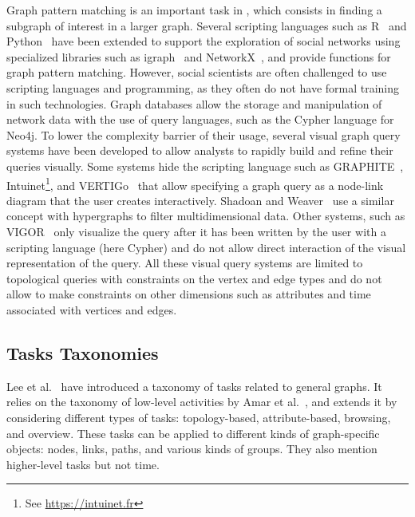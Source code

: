 Graph pattern matching is an important task in \sna, which consists in finding a subgraph of interest in a larger graph\cite{fanGraphPatternMatching2012}.
Several scripting languages such as R~\cite{Rstat} and Python~\cite{Python} have been extended to support the exploration of social networks using specialized libraries such as igraph~\cite{igraph} and NetworkX~\cite{networkx}, and provide functions for graph pattern matching.
However, social scientists are often challenged to use scripting languages and programming, as they often do not have formal training in such technologies.
Graph databases allow the storage and manipulation of network data with the use of query languages, such as the Cypher language for Neo4j\cite{neo4j}.
To lower the complexity barrier of their usage, several visual graph query systems have been developed to allow analysts to rapidly build and refine their queries visually.
Some systems hide the scripting language such as GRAPHITE~\cite{chauGRAPHITEVisualQuery2008}, Intuinet\footnote{See \url{https://intuinet.fr}}, and VERTIGo~\cite{cuencaVERTIGoVisualPlatform2021} that allow specifying a graph query as a node-link diagram that the user creates interactively.
Shadoan and Weaver~\cite{shadoanVisualAnalysisHigherOrder2013} use a similar concept with hypergraphs to filter multidimensional data.
Other systems, such as VIGOR~\cite{pientaVIGORInteractiveVisual2018} only visualize the query after it has been written by the user with a scripting language (here Cypher) and do not allow direct interaction of the visual representation of the query.
All these visual query systems are limited to topological queries with constraints on the vertex and edge types and do not allow to make constraints on other dimensions such as attributes and time associated with vertices and edges.

\iffalse
\subsection{Tasks Taxonomies}

Lee et al.~\cite{lee:hal-00851754} have introduced a taxonomy of tasks related to general graphs.
It relies on the taxonomy of low-level activities by Amar et al.~\cite{Amar05}, and extends it by considering different types of tasks: topology-based, attribute-based, browsing, and overview. These tasks can be applied to different kinds of graph-specific objects: nodes, links, paths, and various kinds of groups.
They also mention higher-level tasks but not time.

